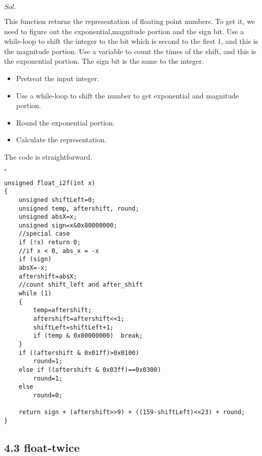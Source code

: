 \documentclass[a4paper, 11pt]{article}
\newenvironment{sol}[1] {\par \noindent $#1.$} {\par \hfill $\square$}
\begin{document}
\begin{sol}{Sol}

This function returns the representation of floating point numbers. To get it, we need to figure out the exponential,magnitude portion and the sign bit. Use a while-loop to shift the integer to the bit which is second to the first $1$, and this is the magnitude portion. Use a variable to count the times of the shift, and this is the exponential portion. The sign bit is the same to the integer. 

\begin{itemize}
    \item Pretreat the input integer.
    \item Use a while-loop to shift the number to get exponential and magnitude portion.
    \item Round the exponential portion.
    \item Calculate the representation.
\end{itemize}

The code is straightforward.
\end{sol}\begin{lstlisting}
unsigned float_i2f(int x)
{
    unsigned shiftLeft=0;
    unsigned temp, aftershift, round;
    unsigned absX=x;
    unsigned sign=x&0x80000000;
    //special case
    if (!x)	return 0;
    //if x < 0, abs_x = -x
    if (sign)
    absX=-x;
    aftershift=absX;
    //count shift_left and after_shift
    while (1)
    {
        temp=aftershift;
        aftershift=aftershift<<1;
        shiftLeft=shiftLeft+1;
        if (temp & 0x80000000) 	break;
    }
    if ((aftershift & 0x01ff)>0x0100)
        round=1;
    else if ((aftershift & 0x03ff)==0x0300)
        round=1;
    else
        round=0;

    return sign + (aftershift>>9) + ((159-shiftLeft)<<23) + round;
}
\end{lstlisting}

\subsection*{4.3 float-twice}
\end{document}
